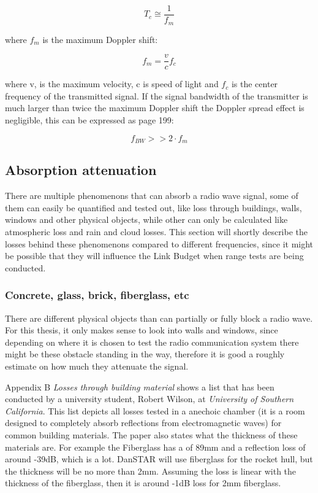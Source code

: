 \begin{equation}
    T_c \cong \frac{1}{f_m}
\end{equation}

where $f_m$ is the maximum Doppler shift:

\begin{equation}
    f_m = \frac{ v}{c}f_c
\end{equation}

where v, is the maximum velocity, c is speed of light and $f_c$ is the center frequency of the transmitted signal. If the signal bandwidth of the transmitter is much larger than twice the maximum Doppler shift the Doppler spread effect is negligible, this can be expressed as\cite{RFpropagation} page 199:

\begin{equation}
    f_{BW} >> 2 \cdot f_m
\end{equation}

\subsection{Absorption attenuation}
There are multiple phenomenons that can absorb a radio wave signal, some of them can easily be quantified and tested out, like loss through buildings, walls, windows and other physical objects, while other can only be calculated like atmospheric loss and rain and cloud losses. This section will shortly describe the losses behind these phenomenons compared to different frequencies, since it might be possible that they will influence the Link Budget when range tests are being conducted. 

\subsubsection{Concrete, glass, brick, fiberglass, etc}
There are different physical objects than can partially or fully block a radio wave. For this thesis, it only makes sense to look into walls and windows, since depending on where it is chosen to test the radio communication system there might be these obstacle standing in the way, therefore it is good a roughly estimate on how much they attenuate the signal. 

Appendix B \textit{Losses through building material} shows a list that has been conducted by a university student, Robert Wilson, at \textit{University of Southern California}. This list depicts all losses tested in a anechoic chamber (it is a room designed to completely absorb reflections from electromagnetic waves) for common building materials. The paper \cite{Magis} also states what the thickness of these materials are. For example the Fiberglass has a of 89mm and a reflection loss of around -39dB, which is a lot. DanSTAR will use fiberglass for the rocket hull, but the thickness will be no more than 2mm. Assuming the loss is linear with the thickness of the fiberglass, then it is around -1dB loss for 2mm fiberglass.

